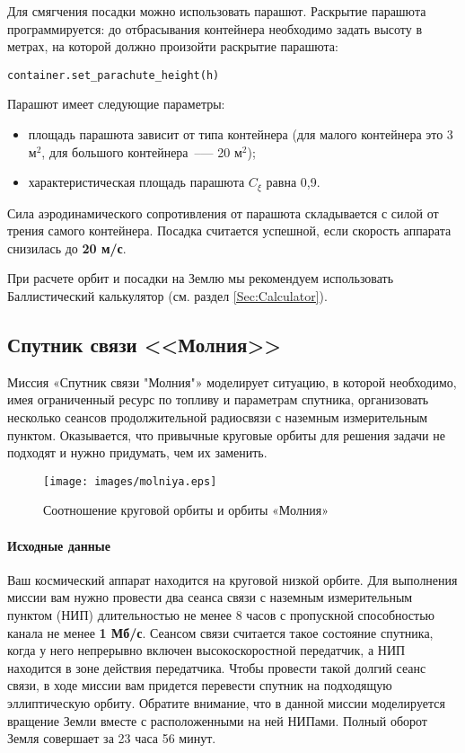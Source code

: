 \documentclass[12pt,a4paper]{article}
\begin{document}
Для смягчения посадки можно использовать парашют. Раскрытие парашюта программируется: до
отбрасывания контейнера необходимо задать высоту в метрах, на которой должно произойти
раскрытие парашюта:

\begin{verbatim}
container.set_parachute_height(h)
\end{verbatim}

Парашют имеет следующие параметры:

\begin{itemize}
\item площадь парашюта зависит от типа контейнера (для малого контейнера это 3
  $\text{м}^2$, для большого контейнера~--— 20 $\text{м}^2$);
\item характеристическая площадь парашюта $C_{\xi}$ равна 0,9.
\end{itemize}

Сила аэродинамического сопротивления от парашюта складывается с силой от трения самого контейнера.
Посадка считается успешной, если скорость аппарата снизилась до \textbf{20 м/с}.

При расчете орбит и посадки на Землю мы рекомендуем использовать Баллистический
калькулятор (см. раздел \ref{Sec:Calculator}).

\clearpage
\subsection{Спутник связи <<Молния>>}

Миссия «Спутник связи "Молния"»  моделирует ситуацию, в которой необходимо, имея
ограниченный ресурс по топливу и параметрам спутника, организовать несколько сеансов
продолжительной радиосвязи с наземным измерительным пунктом. Оказывается, что привычные
круговые орбиты для решения задачи не подходят и нужно придумать, чем их заменить.

\begin{figure}[tbh]
  \begin{center}
    \texttt{[image: images/molniya.eps]}
    \caption{Соотношение круговой орбиты и орбиты «Молния»}
    \label{Pic:Molniya}
  \end{center}
\end{figure}

\paragraph{Исходные данные}

Ваш космический аппарат находится на круговой низкой орбите. Для выполнения миссии вам
нужно провести два сеанса связи с наземным измерительным пунктом (НИП) длительностью не
менее 8 часов с пропускной способностью канала не менее \textbf{1 Мб/с}. Сеансом связи
считается такое состояние спутника, когда у него непрерывно включен высокоскоростной
передатчик, а НИП находится в зоне действия передатчика. Чтобы провести такой долгий сеанс
связи, в ходе миссии вам придется перевести спутник на подходящую эллиптическую
орбиту. Обратите внимание, что в данной миссии моделируется вращение Земли вместе с
расположенными на ней НИПами. Полный оборот Земля совершает за 23 часа 56 минут.
\end{document}
